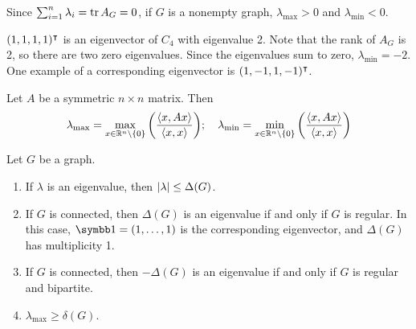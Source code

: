 Since \( \sum_{i=1}^n \lambda_i = \tr A_G = 0 \), if \( G \) is a nonempty graph, \( \lambda_{\mathrm{max}} > 0 \) and \( \lambda_{\mathrm{min}} < 0 \).
\begin{example}
	\( (1, 1, 1, 1)^\intercal \) is an eigenvector of \( C_4 \) with eigenvalue 2.
	Note that the rank of \( A_G \) is 2, so there are two zero eigenvalues.
	Since the eigenvalues sum to zero, \( \lambda_{\mathrm{min}} = -2 \).
	One example of a corresponding eigenvector is \( (1, -1, 1, -1)^\intercal \).
\end{example}
\begin{proposition}
	Let \( A \) be a symmetric \( n \times n \) matrix.
	Then
	\[ \lambda_{\mathrm{max}} = \max_{x \in \mathbb R^n \setminus \qty{0}}\qty( \frac{\left\langle{x, Ax}\right\rangle}{\left\langle{x, x}\right\rangle} ); \quad \lambda_{\mathrm{min}} = \min_{x \in \mathbb R^n \setminus \qty{0}}\qty( \frac{\left\langle{x, Ax}\right\rangle}{\left\langle{x, x}\right\rangle} ) \]
\end{proposition}
\begin{proposition}
	Let \( G \) be a graph.
	\begin{enumerate}
		\item If \( \lambda \) is an eigenvalue, then \( \abs{\lambda} \leq \Delta(G) \).
		\item If \( G \) is connected, then \( \Delta(G) \) is an eigenvalue if and only if \( G \) is regular.
			In this case, \( \symbb 1 = (1, \dots, 1) \) is the corresponding eigenvector, and \( \Delta(G) \) has multiplicity 1.
		\item If \( G \) is connected, then \( -\Delta(G) \) is an eigenvalue if and only if \( G \) is regular and bipartite.
		\item \( \lambda_{\mathrm{max}} \geq \delta(G) \).
	\end{enumerate}
\end{proposition}

